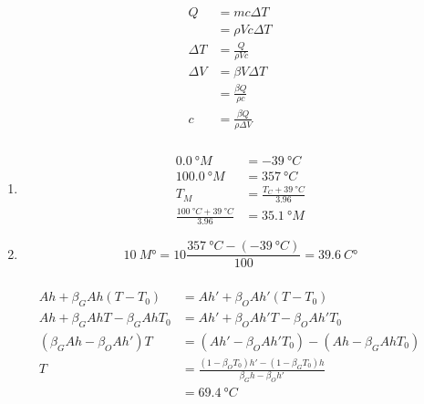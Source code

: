 \documentclass{article}
\begin{document}
\setcounter{subsubsection}{70}
\subsubsection{}

\begin{align*}
  Q        & = m c \Delta T                  \\
           & = \rho V c \Delta T             \\
  \Delta T & = \frac{Q}{\rho V c}            \\
  \Delta V & = \beta V \Delta T              \\
           & = \frac{\beta Q}{\rho c}        \\
  c        & = \frac{\beta Q}{\rho \Delta V}
\end{align*}

\setcounter{subsubsection}{72}
\subsubsection{}

\begin{enumerate}
  \item

        \begin{align*}
          \qty{0.0}{\degree M}                                    & = \qty{-39}{\degree C}                   \\
          \qty{100.0}{\degree M}                                  & = \qty{357}{\degree C}                   \\
          T_M                                                     & = \frac{T_C + \qty{39}{\degree C}}{3.96} \\
          \frac{\qty{100}{\degree C} + \qty{39}{\degree C}}{3.96} & = \qty{35.1}{\degree M}
        \end{align*}

  \item \[\qty{10}{M \degree} = 10 \frac{\qty{357}{\degree C} - (\qty{-39}{\degree C})}{100} = \qty{39.6}{C \degree}\]
\end{enumerate}

\setcounter{subsubsection}{74}
\subsubsection{}

\begin{align*}
  A h + \beta_G A h (T - T_0)           & = A h' + \beta_O A h' (T - T_0)                                             \\
  A h + \beta_G A h T - \beta_G A h T_0 & = A h' + \beta_O A h' T - \beta_O A h' T_0                                  \\
  (\beta_G A h - \beta_O A h') T        & = (A h' - \beta_O A h' T_0) - (A h - \beta_G A h T_0)                       \\
  T                                     & = \frac{(1 - \beta_O T_0) h' - (1 - \beta_G T_0) h}{\beta_G h - \beta_O h'} \\
                                        & = \qty{69.4}{\degree C}
\end{align*}
\end{document}
